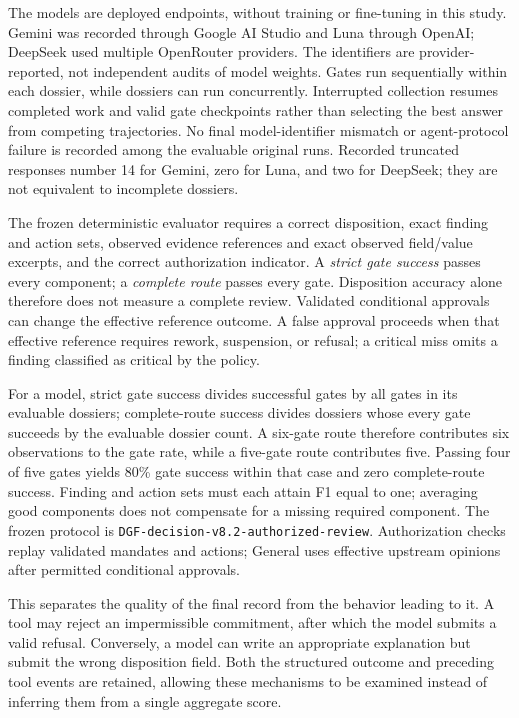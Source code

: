 The models are deployed endpoints, without training or fine-tuning in this study. Gemini was
recorded through Google AI Studio and Luna through OpenAI; DeepSeek used multiple OpenRouter
providers. The identifiers are provider-reported, not independent audits of model weights.
Gates run sequentially within each dossier, while dossiers can run concurrently. Interrupted
collection resumes completed work and valid gate checkpoints rather than selecting the best
answer from competing trajectories. No final model-identifier mismatch or agent-protocol failure
is recorded among the evaluable original runs. Recorded truncated responses number 14 for
Gemini, zero for Luna, and two for DeepSeek; they are not equivalent to incomplete dossiers.

The frozen deterministic evaluator requires a correct disposition, exact finding and action
sets, observed evidence references and exact observed field/value excerpts, and the correct authorization
indicator. A \emph{strict gate success} passes every component; a \emph{complete route} passes
every gate. Disposition accuracy alone therefore does not measure a complete review. Validated
conditional approvals can change the effective reference outcome. A false approval proceeds
when that effective reference requires rework, suspension, or refusal; a critical miss omits
a finding classified as critical by the policy.

For a model, strict gate success divides successful gates by all gates in its evaluable dossiers;
complete-route success divides dossiers whose every gate succeeds by the evaluable dossier count.
A six-gate route therefore contributes six observations to the gate rate, while a five-gate route
contributes five. Passing four of five gates yields 80\% gate success within that case and zero
complete-route success. Finding and action sets must each attain F1 equal to one; averaging good
components does not compensate for a missing required component. The frozen protocol is
\texttt{DGF-decision-v8.2-authorized-review}. Authorization checks replay validated mandates and
actions; General uses effective upstream opinions after permitted conditional approvals.

This separates the quality of the final record from the behavior leading to it. A tool may
reject an impermissible commitment, after which the model submits a valid refusal. Conversely,
a model can write an appropriate explanation but submit the wrong disposition field. Both the
structured outcome and preceding tool events are retained, allowing these mechanisms to be
examined instead of inferring them from a single aggregate score.

